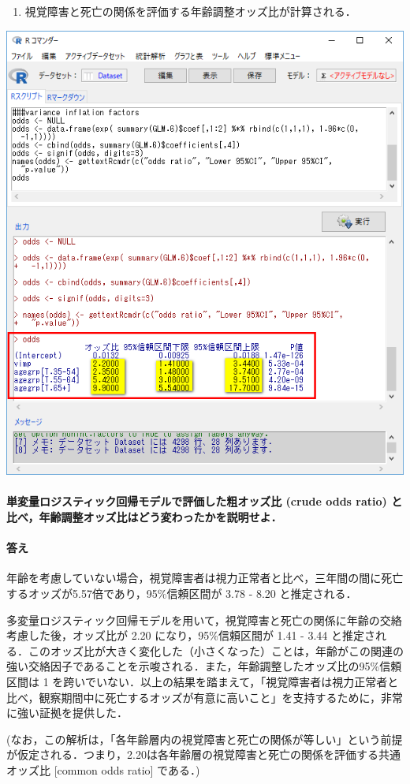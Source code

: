 \documentclass[11pt,]{problemset}
\providecommand{\tightlist}{%
  \setlength{\itemsep}{0pt}\setlength{\parskip}{0pt}}
\let\oldparagraph\paragraph
\renewcommand{\paragraph}[1]{\oldparagraph{#1}\mbox{}}
\begin{document}
\begin{enumerate}
\def\labelenumi{\arabic{enumi}.}
\setcounter{enumi}{3}
\tightlist
\item
  視覚障害と死亡の関係を評価する年齢調整オッズ比が計算される．
\end{enumerate}

\begin{center}\includegraphics[width=0.5\linewidth,height=0.5\textheight]{pic/mltlogstic07} \end{center}

\hypertarget{-crude-odds-ratio-}{%
\paragraph{単変量ロジスティック回帰モデルで評価した粗オッズ比 (crude
odds ratio)
と比べ，年齢調整オッズ比はどう変わったかを説明せよ．}\label{-crude-odds-ratio-}}

\hypertarget{-7}{%
\paragraph{答え}\label{-7}}

年齢を考慮していない場合，視覚障害者は視力正常者と比べ，三年間の間に死亡するオッズが5.57倍であり，95\%信頼区間が
3.78 - 8.20 と推定される．

多変量ロジスティック回帰モデルを用いて，視覚障害と死亡の関係に年齢の交絡考慮した後，オッズ比が
2.20 になり，95\%信頼区間が 1.41 - 3.44
と推定される．このオッズ比が大きく変化した（小さくなった）ことは，年齢がこの関連の強い交絡因子であることを示唆される．また，年齢調整したオッズ比の95\%信頼区間は
1
を跨いでいない．以上の結果を踏まえて，「視覚障害者は視力正常者と比べ，観察期間中に死亡するオッズが有意に高いこと」を支持するために，非常に強い証拠を提供した．

(なお，この解析は，「各年齢層内の視覚障害と死亡の関係が等しい」という前提が仮定される．つまり，2.20は各年齢層の視覚障害と死亡の関係を評価する共通オッズ比
{[}common odds ratio{]} である．)
\end{document}
